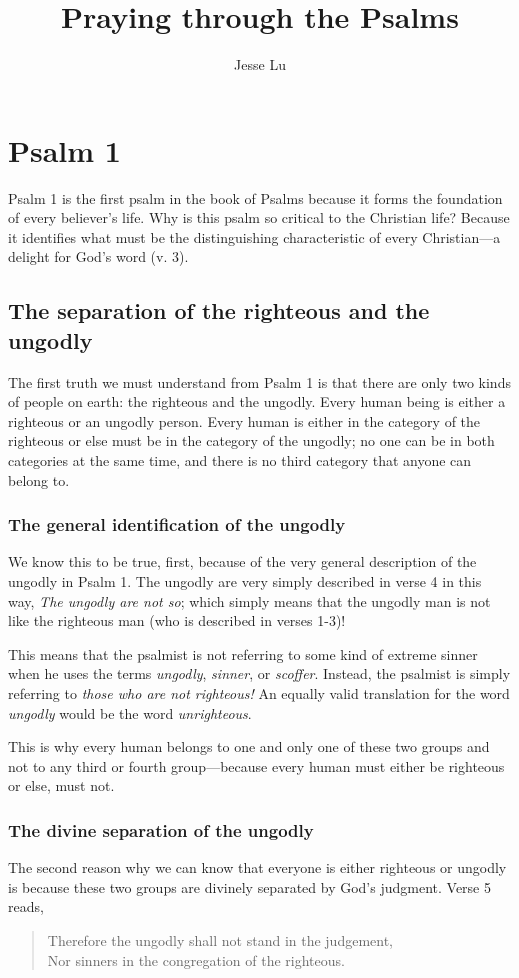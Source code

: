 \documentclass[a5paper]{book}
\title{Praying through the Psalms}
\author{Jesse Lu}
\newcommand{\q}[1]{\textit{#1}}
\newcommand{\Q}[1]{\begin{quote}#1\end{quote}}
\begin{document}
\maketitle
\tableofcontents

\chapter{Psalm 1}
Psalm 1 is the first psalm in the book of Psalms
    because it forms the foundation of every believer's life.
Why is this psalm so critical to the Christian life?
Because it identifies what must be the distinguishing characteristic
    of every Christian---a delight for God's word (v. 3).

\section{The separation of the righteous and the ungodly}
The first truth we must understand from Psalm 1
    is that there are only two kinds of people on earth:
    the righteous and the ungodly.
Every human being is either a righteous or an ungodly person.
Every human is either in the category of the righteous or 
    else must be in the category of the ungodly;
    no one can be in both categories at the same time,
    and there is no third category that anyone can belong to.

\subsection{The general identification of the ungodly}
We know this to be true, first,
    because of the very general description of the ungodly in Psalm 1.
The ungodly are very simply described in verse 4 in this way, 
    \q{The ungodly are not so};
    which simply means that the ungodly man is not like the righteous man
    (who is described in verses 1-3)!

This means that the psalmist is not referring to some kind of extreme sinner
    when he uses the terms \emph{ungodly}, \emph{sinner}, or \emph{scoffer}.
Instead, the psalmist is simply referring to \emph{those who are not righteous!}
An equally valid translation for the word \q{ungodly}
    would be the word \q{unrighteous}.

This is why every human belongs to one and only one of these two groups
    and not to any third or fourth group---because 
    every human must either be righteous or else, must not.

\subsection{The divine separation of the ungodly}
The second reason why we can know that
    everyone is either righteous or ungodly is
    because these two groups are divinely separated by God's judgment.
Verse 5 reads,
    \Q{Therefore the ungodly shall not stand in the judgement, \\
    Nor sinners in the congregation of the righteous.}
\end{document}

